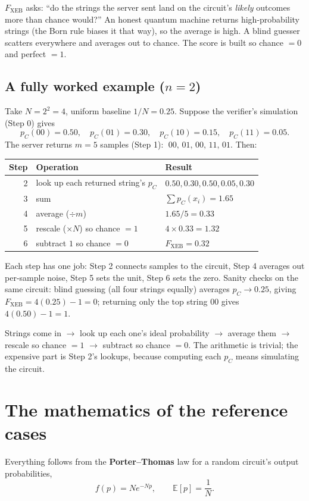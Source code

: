 \documentclass[11pt]{article}
\theoremstyle{definition}
\theoremstyle{plain}
\newcommand{\Fxeb}{F_{\mathrm{XEB}}}
\newcommand{\E}{\mathbb{E}}
\begin{document}
\begin{plain}
$\Fxeb$ asks: ``do the strings the server sent land on the circuit's \emph{likely}
outcomes more than chance would?'' An honest quantum machine returns high-probability
strings (the Born rule biases it that way), so the average is high. A blind guesser
scatters everywhere and averages out to chance. The score is built so chance $=0$ and
perfect $=1$.
\end{plain}

\subsection{A fully worked example ($n=2$)}
Take $N=2^2=4$, uniform baseline $1/N=0.25$. Suppose the verifier's simulation (Step 0)
gives
\[
p_C(00)=0.50,\quad p_C(01)=0.30,\quad p_C(10)=0.15,\quad p_C(11)=0.05 .
\]
The server returns $m=5$ samples (Step 1): $\;00,\,01,\,00,\,11,\,01$. Then:
\begin{center}
\renewcommand{\arraystretch}{1.15}
\begin{tabular}{r l l}
\toprule
Step & Operation & Result \\
\midrule
2 & look up each returned string's $p_C$ & $0.50,0.30,0.50,0.05,0.30$ \\
3 & sum & $\sum p_C(x_i)=1.65$ \\
4 & average ($\div m$) & $1.65/5 = 0.33$ \\
5 & rescale ($\times N$) so chance $=1$ & $4\times0.33 = 1.32$ \\
6 & subtract $1$ so chance $=0$ & $\Fxeb = 0.32$ \\
\bottomrule
\end{tabular}
\end{center}
Each step has one job: Step 2 connects samples to the circuit, Step 4 averages out
per-sample noise, Step 5 sets the unit, Step 6 sets the zero. Sanity checks on the same
circuit: blind guessing (all four strings equally) averages $p_C\to0.25$, giving
$\Fxeb=4(0.25)-1=0$; returning only the top string $00$ gives $4(0.50)-1=1$.

\begin{plain}
Strings come in $\to$ look up each one's ideal probability $\to$ average them $\to$ rescale
so chance $=1$ $\to$ subtract so chance $=0$. The arithmetic is trivial; the expensive part
is Step 2's lookups, because computing each $p_C$ means simulating the circuit.
\end{plain}

\section{The mathematics of the reference cases}
Everything follows from the \textbf{Porter--Thomas} law for a random circuit's output
probabilities,
\begin{equation}\label{eq:pt}
f(p) = N e^{-Np}, \qquad \E[p]=\frac1N .
\end{equation}
\end{document}
